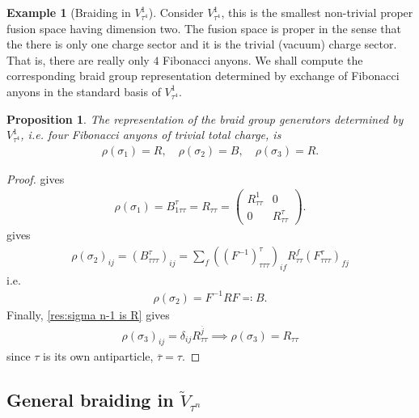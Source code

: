 \documentclass[a4paper,10pt,oneside]{book}
\theoremstyle{plain}
\newtheorem{proposition}[theorem]{Proposition}
\theoremstyle{definition}
\newtheorem{example}{Example}[section]
\theoremstyle{remark}
\begin{document}
\begin{example}[Braiding in $V_{τ^4}^1$]
  Consider $V_{τ^4}^1$, this is the smallest non-trivial proper fusion space having dimension two. The fusion space is proper in the sense that the there is only one charge sector and it is the trivial (vacuum) charge sector. That is, there are really only $4$ Fibonacci anyons. We shall compute the corresponding braid group representation determined by exchange of Fibonacci anyons in the standard basis of $V_{τ^4}^1$.

  \begin{proposition}
    The representation of the braid group generators determined by $V_{τ^4}^1$, i.e. four Fibonacci anyons of trivial total charge, is
    \begin{align*}
      ρ(σ_1) = R,\quad
      ρ(σ_2) = B,\quad
      ρ(σ_3) = R.
    \end{align*}
  \end{proposition}

  \begin{proof}
     gives
    \begin{align*}
      ρ(σ_1) = B_{1ττ}^{τ} = R_{ττ} =
      \begin{pmatrix}
        R_{ττ}^1 & 0 \\
        0 & R_{ττ}^τ
      \end{pmatrix}.
    \end{align*}
     gives
    \begin{align*}
      ρ(σ_2)_{ij} = \left( B^τ_{τττ} \right)_{ij} = \sum_f \left( \left(F^{-1}\right)_{τττ}^τ \right)_{if} R_{ττ}^f \left( F_{τττ}^τ \right)_{fj}
    \end{align*}
    i.e.
    \begin{align*}
      ρ(σ_2) = F^{-1} R F \eqqcolon B.
    \end{align*}
    Finally, \cref{res:sigma n-1 is R} gives
    \begin{align*}
      ρ(σ_3)_{ij} = \delta_{ij} R_{ττ}^{\overline{j}}
      \implies
      ρ(σ_3) = R_{ττ}
    \end{align*}
    since $τ$ is its own antiparticle, $\overline{τ} = τ$.
  \end{proof}
\end{example}






\subsection{General braiding in \texorpdfstring{$\widetilde{V}_{τ^n}$}{V\~_(τⁿ)}}
\end{document}
